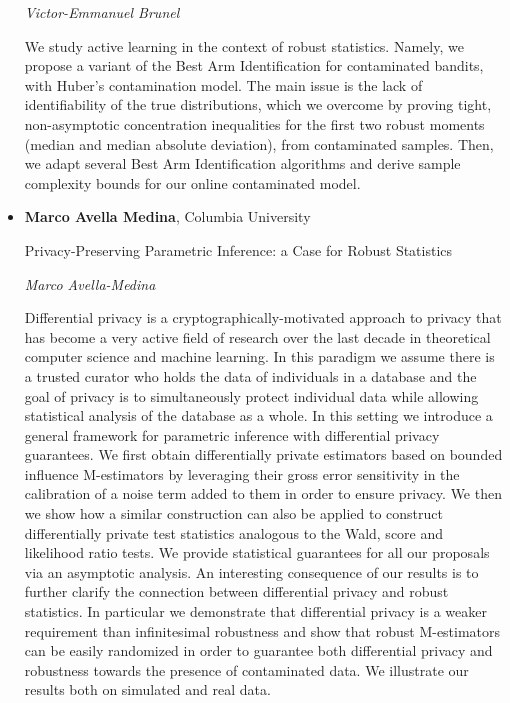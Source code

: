 \begin{itemize}
\emph{\footnotesize Victor-Emmanuel Brunel}

We study active learning in the context of robust statistics. Namely, we propose a variant of the Best Arm Identification for contaminated bandits, with Huber's contamination model. The main issue is the lack of identifiability of the true distributions, which we overcome by proving tight, non-asymptotic concentration inequalities for the first two robust moments (median and median absolute deviation), from contaminated samples. Then, we adapt several Best Arm Identification algorithms and derive sample complexity bounds for our online contaminated model.

\item \textbf{Marco Avella Medina}, Columbia University

Privacy-Preserving Parametric Inference: a Case for Robust Statistics

\emph{\footnotesize Marco Avella-Medina}

Differential privacy is a cryptographically-motivated approach to privacy that has become a very active field of research over the last decade in theoretical computer science and machine learning. In this paradigm we assume there is a trusted curator who holds the data of individuals in a database and the goal of privacy is to simultaneously protect individual data while allowing statistical analysis of the database as a whole. In this setting we introduce a general framework for parametric inference with differential privacy guarantees. We first obtain differentially private estimators based on bounded influence M-estimators by leveraging their gross error sensitivity in the calibration of a noise term added to them in order to ensure privacy. We then we show how a similar construction can also be applied to construct differentially private test statistics analogous to the Wald, score and likelihood ratio tests. We provide statistical guarantees for all our proposals via an asymptotic analysis. An interesting consequence of our results is to further clarify the connection between differential privacy and robust statistics. In particular we demonstrate that differential privacy is a weaker requirement than infinitesimal robustness and show that robust M-estimators can be easily randomized in order to guarantee both differential privacy and robustness towards the presence of contaminated data. We illustrate our results both on simulated and real data.

\end{itemize}

